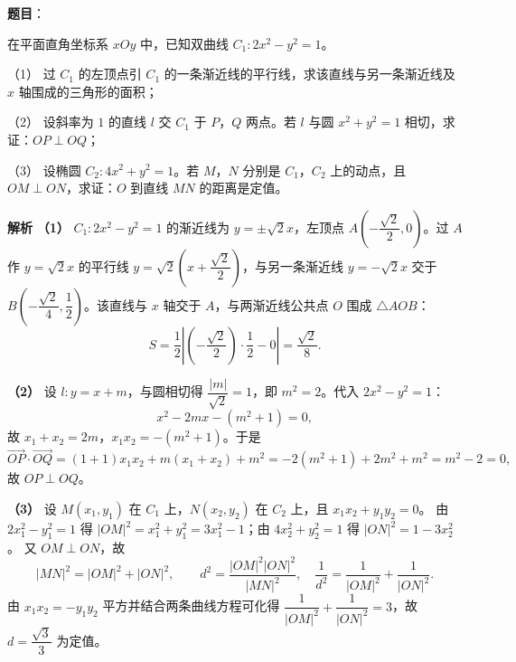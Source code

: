 \begin{answer}

\textbf{题目}：

在平面直角坐标系 $xOy$ 中，已知双曲线 $C_1:2x^2-y^2=1$。

（1） 过 $C_1$ 的左顶点引 $C_1$ 的一条渐近线的平行线，求该直线与另一条渐近线及 $x$ 轴围成的三角形的面积；

（2） 设斜率为 $1$ 的直线 $l$ 交 $C_1$ 于 $P$，$Q$ 两点。若 $l$ 与圆 $x^2+y^2=1$ 相切，求证：$OP\perp OQ$；

（3） 设椭圆 $C_2:4x^2+y^2=1$。若 $M$，$N$ 分别是 $C_1$，$C_2$ 上的动点，且 $OM\perp ON$，求证：$O$ 到直线 $MN$ 的距离是定值。

\textbf{解析}
\textbf{（1）} $C_1:2x^2-y^2=1$ 的渐近线为 $y=\pm\sqrt2x$，左顶点 $A\left(-\dfrac{\sqrt2}2,0\right)$。过 $A$ 作 $y=\sqrt2x$ 的平行线 $y=\sqrt2\left(x+\dfrac{\sqrt2}2\right)$，与另一条渐近线 $y=-\sqrt2x$ 交于 $B\left(-\dfrac{\sqrt2}4,\dfrac12\right)$。该直线与 $x$ 轴交于 $A$，与两渐近线公共点 $O$ 围成 $\triangle AOB$：
\nopagebreak[4]
\[S=\frac12\left|\left(-\frac{\sqrt2}2\right)\cdot\frac12-0\right|=\frac{\sqrt2}8.\]

\textbf{（2）} 设 $l:y=x+m$，与圆相切得 $\dfrac{|m|}{\sqrt2}=1$，即 $m^2=2$。代入 $2x^2-y^2=1$：
\nopagebreak[4]
\[x^2-2mx-(m^2+1)=0,\]
故 $x_1+x_2=2m$，$x_1x_2=-(m^2+1)$。于是
\nopagebreak[4]
\[\overrightarrow{OP}\cdot\overrightarrow{OQ}=(1+1)x_1x_2+m(x_1+x_2)+m^2=-2(m^2+1)+2m^2+m^2=m^2-2=0,\]
故 $OP\perp OQ$。

\textbf{（3）} 设 $M(x_1,y_1)$ 在 $C_1$ 上，$N(x_2,y_2)$ 在 $C_2$ 上，且 $x_1x_2+y_1y_2=0$。
由 $2x_1^2-y_1^2=1$ 得 $|OM|^2=x_1^2+y_1^2=3x_1^2-1$；由 $4x_2^2+y_2^2=1$ 得 $|ON|^2=1-3x_2^2$。
又 $OM\perp ON$，故
\nopagebreak[4]
\[|MN|^2=|OM|^2+|ON|^2,\qquad d^2=\frac{|OM|^2|ON|^2}{|MN|^2},\quad \frac1{d^2}=\frac1{|OM|^2}+\frac1{|ON|^2}.\]
由 $x_1x_2=-y_1y_2$ 平方并结合两条曲线方程可化得 $\dfrac1{|OM|^2}+\dfrac1{|ON|^2}=3$，故 $d=\dfrac{\sqrt3}3$ 为定值。




\end{answer}
